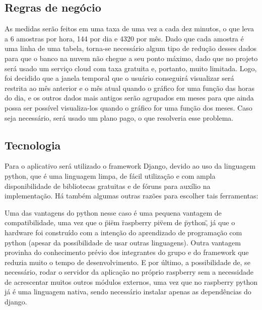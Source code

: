 \subsection{Regras de negócio}

As medidas serão feitos em uma taxa de uma vez a cada dez minutos, o que leva a 6 amostras por hora, 144 por dia e 4320 por mês. Dado que cada amostra é uma linha de uma tabela, torna-se necessário algum tipo de redução desses dados para que o banco na nuvem não chegue a seu ponto máximo, dado que no projeto será usado um serviço cloud com taxa gratuita e, portanto, muito limitada. Logo, foi decidido que a janela temporal que o usuário conseguirá visualizar será restrita ao mês anterior e o mês atual quando o gráfico for uma função das horas do dia, e os outros dados mais antigos serão agrupados em meses para que ainda possa ser possível visualiza-los quando o gráfico for uma função dos meses. Caso seja necessário, será usado um plano pago, o que resolveria esse problema.

\subsection{Tecnologia}

Para o aplicativo será utilizado o framework Django, devido ao uso da linguagem python, que é uma linguagem limpa, de fácil utilização e com ampla disponibilidade de bibliotecas gratuitas e de fóruns para auxílio na implementação.
Há também algumas outras razões para escolher tais ferramentas:

Uma das vantagens do python nesse caso é uma pequena vantagem de compatibilidade, uma vez que o \"pi\" em \"raspberry pi\" vem de \"python\", já que o hardware foi construído com a intenção do aprendizado de programação com python \cite{raspberry_pi_site} (apesar da possibilidade de usar outras linguagens). Outra vantagem provinha do conhecimento prévio dos integrantes do grupo e do framework que reduzia muito o tempo de desenvolvimento. E por último, a possibilidade de, se necessário, rodar o servidor da aplicação no próprio raspberry sem a necessidade de acrescentar muitos outros módulos externos, uma vez que no raspberry python já é uma linguagem nativa, sendo necessário instalar apenas as dependências do django.